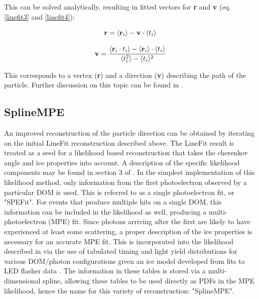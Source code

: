 This can be solved analytically, resulting in fitted vectors for \textbf{r} and \textbf{v} (eq. \ref{linefit3} and \ref{linefit4}):

\begin{equation}
    \textbf r = \langle \textbf r_i \rangle - \textbf v \cdot \langle t_i \rangle
    \label{linefit3}
\end{equation}

\begin{equation}
    \textbf v = \frac{\langle \textbf r_i \cdot t_i \rangle - \langle \textbf r_i \rangle \cdot \langle t_i \rangle }{\langle t_i^2 \rangle - \langle t_i \rangle^2}
    \label{linefit4}
\end{equation}

This corresponds to a vertex (\textbf{r}) and a direction (\textbf{v}) describing the path of the particle. Further discussion on this topic can be found in \cite{track_reco_paper}.

\subsection{SplineMPE}
An improved reconstruction of the particle direction can be obtained by iterating on the initial LineFit reconstruction described above. The LineFit result is treated as a seed for a likelihood based reconstruction that takes the cherenkov angle and ice properties into account. A description of the specific likelihood components may be found in section 3 of \cite{track_reco_paper}. In the simplest implementation of this likelihood method, only information from the first photoelectron observed by a particular DOM is used. This is referred to as a single photoelectron fit, or "SPEFit". For events that produce multiple hits on a single DOM, this information can be included in the likelihood as well, producing a multi-photoelectron (MPE) fit. Since photons arriving after the first are likely to have experienced at least some scattering, a proper description of the ice properties is necessary for an accurate MPE fit. This is incorporated into the likelihood described in \cite{track_reco_paper} via the use of tabulated timing and light yield distributions for various DOM/photon configurations given an ice model developed from fits to LED flasher data \cite{icemodel_paper}. The information in these tables is stored via a multi-dimensional spline, allowing these tables to be used directly as PDFs in the MPE likelihood, hence the name for this variety of reconstruction: "SplineMPE".


